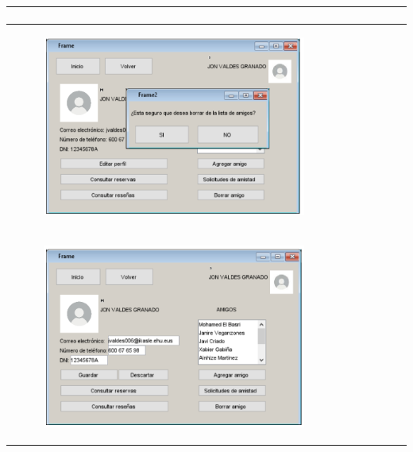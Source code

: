 \documentclass{report}
\begin{document}
\begin{center}
\begin{longtable}{|p{\linewidth}|}
\begin{figure}[H]
                \end{figure}\\
                \hline
                 \begin{figure}[H]
                    \centering
                    \includegraphics[width=0.8\textwidth]{./img/grafico/interfazAlertaBorrarAmigo.png}
                \end{figure}\\
                 \begin{figure}[H]
                    \centering
                    \includegraphics[width=0.8\textwidth]{./img/grafico/InterfazEditarPerfil.png}
                \end{figure}\\
            \end{longtable}
        \end{center}
        \clearpage
\end{document}
